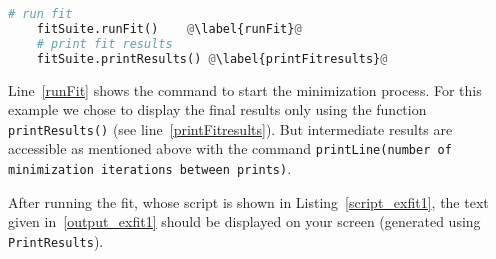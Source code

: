 

\begin{lstlisting}[language=python, style=eclipseboxed, name=exfit,nolol]
    # run fit 
    fitSuite.runFit()    @\label{runFit}@
    # print fit results
    fitSuite.printResults() @\label{printFitresults}@
\end{lstlisting}

Line~\ref{runFit} shows the command to start the minimization
process. For this example we chose to display the final results only
using the function \texttt{printResults()} (see
line~\ref{printFitresults}). But intermediate results are accessible as
mentioned above with the command \texttt{printLine(number of
 minimization iterations between prints)}.

After running the fit, whose script is shown in
Listing~\ref{script_exfit1}, the text given in~\ref{output_exfit1} should be displayed on your
screen (generated using \texttt{PrintResults}).

